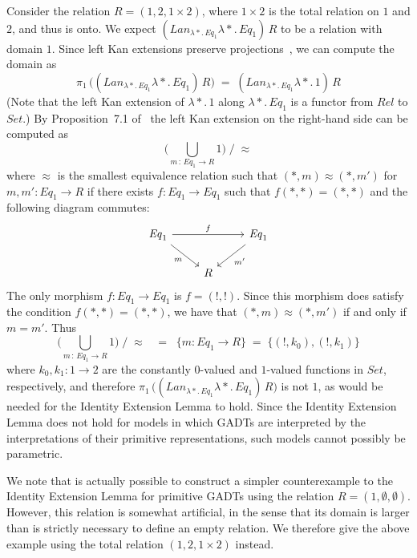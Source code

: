 \documentclass[acmsmall,screen,review,anonymous]{acmart}
\theoremstyle{definition}
\begin{document}
\begin{example}
Consider the relation $R = (1, 2, 1 \times 2)$, where $1 \times 2$ is
the total relation on $1$ and $2$, and thus is onto. We expect
$(\mathit{Lan}_{\lambda *\!.\,\mathit{Eq}_1} \lambda
*\!.\,\mathit{Eq}_1)\, R$ to be a relation with domain $1$. Since left
Kan extensions preserve projections~\cite{rie16}, we can compute the
domain as
\[\pi_1\,\big( (\mathit{Lan}_{\lambda *\!.\,\mathit{Eq}_1} \lambda
*\!.\,\mathit{Eq}_1) \, R \big)\;=\; (\mathit{Lan}_{\lambda
 *\!.\,\mathit{Eq}_1} \lambda *\!. \,1)\, R\] (Note that the left Kan
 extension of $\lambda *\!. \,1$ along $\lambda *\!.\,\mathit{Eq}_1$
 is a functor from $\mathit{Rel}$ to $\mathit{Set}$.) By
 Proposition~7.1 of~\cite{blw03} the left Kan extension on the
 right-hand side can be computed as
\[ \big( \bigcup_{m\, :\, \mathit{Eq}_1 \to R} 1 \big) \; /\; \approx\]
where $\approx$ is the smallest equivalence relation such that $(\ast,
m) \approx (\ast, m')$ for $m, m' : \mathit{Eq}_1 \to R$ if there
exists $f : \mathit{Eq}_1 \to \mathit{Eq}_1$ such that $f (\ast, \ast)
= (\ast, \ast)$ and the following diagram commutes:
\[
\begin{tikzcd}
\mathit{Eq}_1 \ar[rr, "{f}"] \ar[dr, "m"']
&&\mathit{Eq}_1 \ar[dl, "m'"] \\
&R
\end{tikzcd}
\]
The only morphism $f : \mathit{Eq}_1 \to \mathit{Eq}_1$ is $f = (!,
!)$. Since this morphism does satisfy the condition $f (\ast, \ast) =
(\ast, \ast)$, we have that $(\ast, m) \approx (\ast, m')$ if and only
if $m = m'$. Thus
\[ \big( \bigcup_{m\, :\,
  \mathit{Eq}_1 \to R} 1 \big) \; /\; \approx \;\;\; = \;\; \{m :
\mathit{Eq}_1 \to R\} \;=\; \{(!, k_0), (!, k_1)\}\] where $k_0, k_1 :
1 \to 2$ are the constantly $0$-valued and $1$-valued functions in
$\mathit{Set}$, respectively, and therefore $\pi_1\,\big(
(\mathit{Lan}_{\lambda *\!.\,\mathit{Eq}_1} \lambda
*\!.\,\mathit{Eq}_1) \, R \big)$ is not $1$, as would be needed for
the Identity Extension Lemma to hold.  Since the Identity Extension
Lemma does not hold for models in which GADTs are interpreted by the
interpretations of their primitive representations, such models cannot
possibly be parametric.
\end{example}

We note that is actually possible to construct a simpler
counterexample to the Identity Extension Lemma for primitive GADTs
using the relation $R = (1,\emptyset, \emptyset)$. However, this
relation is somewhat artificial, in the sense that its domain is
larger than is strictly necessary to define an empty relation. We
therefore give the above example using the {\color{blue} total}
relation $(1,2,1 \times 2)$ instead.
\end{document}
